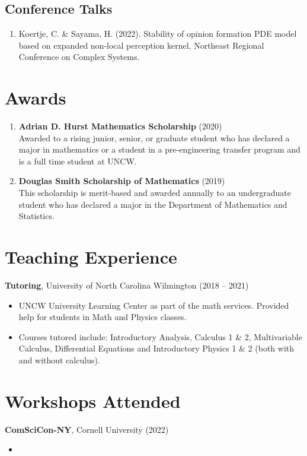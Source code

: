 \documentclass[12pt]{article}
\begin{document}
\subsection{Conference Talks}
\begin{enumerate}
    \itemsep = 0em
    \item Koertje, C. \& Sayama, H. (2022). Stability of opinion formation PDE model based on expanded non-local perception kernel, Northeast Regional Conference on Complex Systems.
\end{enumerate}


\section{Awards}
\begin{enumerate}
    \itemsep = 0em
    \item \textbf{Adrian D. Hurst Mathematics Scholarship} \hfill (2020) \\
    Awarded to a rising junior, senior, or graduate student who has declared a major in mathematics or a student in a pre-engineering transfer program and is a full time student at UNCW.
    \item \textbf{Douglas Smith Scholarship of Mathematics} \hfill (2019) \\
    This scholarship is merit-based and awarded annually to an undergraduate student who has declared a major in the Department of Mathematics and Statistics.
\end{enumerate}

\section{Teaching Experience }
\textbf{Tutoring}, University of North Carolina Wilmington \hfill (2018 -- 2021)
\begin{itemize}
    \itemsep = 0em
    \item UNCW University Learning Center as part of the math services. Provided help for students in Math and Physics classes.
    \item Courses tutored include: Introductory Analysis, Calculus 1 \& 2, Multivariable Calculus, Differential Equations and Introductory Physics 1 \& 2 (both with and without calculus).
\end{itemize}

\section{Workshops Attended}
\textbf{ComSciCon-NY}, Cornell University \hfill (2022)
\begin{itemize}
    \itemsep = 0em
    \item
\end{itemize}
\end{document}
